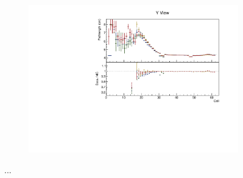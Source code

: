 \documentclass[12pt,a4paper]{article}
\begin{document}
\begin{figure}[h!]
\begin{subfigure}{0.5\textwidth}
  \end{subfigure}
  \begin{subfigure}{0.5\textwidth}
    \includegraphics[width=\linewidth]{essentialsec_tb/cm_cell_y.pdf}
  \end{subfigure}
  \caption{...}
  \label{figAbsCalibCell2}
\end{figure}
\end{document}
